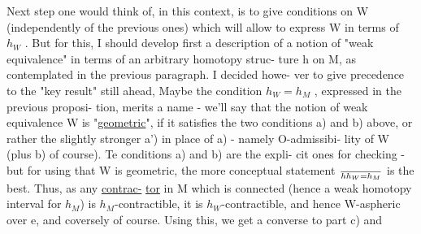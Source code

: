 Next step one would think of, in this context, is to give conditions
on W (independently of the previous ones) which will allow to express
W in terms of $h_W$ . But for this, I should develop first a description
of a notion of "weak equivalence" in terms of an arbitrary homotopy struc-%
ture h on M, as contemplated in the previous paragraph\hand{(*)}. I decided howe-%
ver to give precedence to the "key result" still ahead, 
 Maybe the condition $h_W = h_M$ , expressed in the previous proposi-%
tion, merits a name - we'll say that the notion of weak equivalence W
is "\uline{geometric}", if it satisfies the two conditions a) and b) above,
or rather the slightly stronger a') in place of a) - namely O-admissibi-%
lity of W (plus b) of course). Te conditions a) and b) are the expli-%
cit ones for checking - but for using that W is geometric, the
more conceptual statement $\over{h}{h}_W = h_M$  is the best. Thus, as any \uline{contrac-}%
\margin{$+$}
\uline{tor} in M which is connected (hence a weak homotopy interval for $h_M$) is
$h_M$-contractible, it is $h_W$-contractible, and hence W-aspheric over e,
and coversely of course. Using this, we get a converse to part c) and

